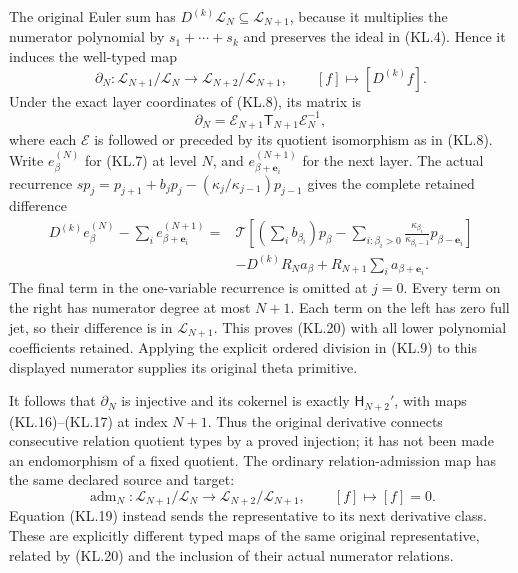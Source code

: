 The original Euler sum has
\(D^{(k)}\mathcal L_N\subseteq\mathcal L_{N+1}\), because
it multiplies the numerator polynomial by \(s_1+\cdots+s_k\)
and preserves the ideal in (KL.4).  Hence it induces the well-typed
map
\[
 \partial_N:\mathcal L_{N+1}/\mathcal L_N
       \longrightarrow\mathcal L_{N+2}/\mathcal L_{N+1},
 \qquad [f]\longmapsto[D^{(k)}f].                       \tag{KL.19}
\]
Under the exact layer coordinates of (KL.8), its matrix is
\[
 \boxed{\partial_N=\mathscr E_{N+1}\mathsf T_{N+1}
                                           \mathscr E_N^{-1},}
                                                               \tag{KL.20}
\]
where each \(\mathscr E\) is followed or preceded by its quotient
isomorphism as in (KL.8).  Write \(e_\beta^{(N)}\) for (KL.7)
at level \(N\), and \(e_{\beta+\mathbf e_i}^{(N+1)}\) for
the next layer.  The actual recurrence
\(sp_j=p_{j+1}+b_jp_j-(\kappa_j/\kappa_{j-1})p_{j-1}\)
gives the complete retained difference
\[
\begin{split}
 D^{(k)}e_\beta^{(N)}-\sum_i e_{\beta+\mathbf e_i}^{(N+1)}
 ={}&\mathcal T\left[
       \left(\sum_i b_{\beta_i}\right)p_\beta
       -\sum_{i:\beta_i>0}
        \frac{\kappa_{\beta_i}}{\kappa_{\beta_i-1}}
                       p_{\beta-\mathbf e_i}\right]\\
    &-D^{(k)}R_Na_\beta
      +R_{N+1}\sum_i a_{\beta+\mathbf e_i}.
\end{split}
\]
The final term in the one-variable recurrence is omitted at \(j=0\).
Every term on the right has numerator degree at most \(N+1\).
Each term on the left has zero full jet, so their difference is in
\(\mathcal L_{N+1}\).  This proves (KL.20) with all lower
polynomial coefficients retained.  Applying the explicit ordered
division in (KL.9) to this displayed numerator supplies its original
theta primitive.

It follows that \(\partial_N\) is injective and its cokernel is
exactly \(\mathsf H_{N+2}'\), with maps (KL.16)--(KL.17) at
index \(N+1\).  Thus the original derivative connects consecutive
relation quotient types by a proved injection; it has not been made
an endomorphism of a fixed quotient.  The ordinary relation-admission
map has the same declared source and target:
\[
 \operatorname{adm}_N:\mathcal L_{N+1}/\mathcal L_N
       \longrightarrow\mathcal L_{N+2}/\mathcal L_{N+1},
 \qquad [f]\longmapsto[f]=0.
\]
Equation (KL.19) instead sends the representative to its next
derivative class.  These are explicitly different typed maps of the
same original representative, related by (KL.20) and the inclusion
of their actual numerator relations.

